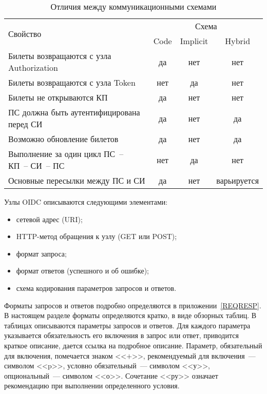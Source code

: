\begin{table}[H]
\caption{Отличия между коммуникационными схемами}\label{Table.OIDC.Flows}
\begin{tabular}{|l|c|c|c|}
\hline
\multirow{2}{*}{Свойство} & \multicolumn{3}{c|}{Схема}\\
\cline{2-4}
& Code & Implicit & Hybrid\\
\hline
\hline
Билеты возвращаются с узла Authorization & да & нет & нет\\
Билеты возвращаются с узла Token & нет & да & нет\\
Билеты не открываются КП & да & нет & нет\\
ПС должна быть аутентифицирована перед СИ & да & нет & да\\
Возможно обновление билетов & да & нет & да\\
Выполнение за один цикл ПС~-- КП~-- СИ~-- ПС & нет & да & нет\\
Основные пересылки между ПС и СИ & да & нет & варьируется\\
\hline
\end{tabular}
\end{table}

Узлы OIDC описываются следующими элементами:
\begin{itemize}
\item сетевой адрес (URI);
\item HTTP-метод обращения к узлу (GET или POST);
\item формат запроса;
\item формат ответов (успешного и об ошибке);
\item схема кодирования параметров запросов и ответов.
\end{itemize} 

Форматы запросов и ответов подробно определяются в приложении~\ref{REQRESP}.
В настоящем разделе форматы определяются  кратко, в виде обзорных таблиц.
% 
В таблицах описываются параметры запросов и ответов.
Для каждого параметра указывается обязательность его включения в запрос или 
ответ, приводится краткое описание, дается ссылка на подробное описание.
%
Параметр, обязательный для включения, помечается знаком <<$+$>>,
рекомендуемый для включения~--- символом <<p>>,
условно обязательный~--- символом <<у>>,
опциональный~--- символом <<о>>. Сочетание <<ру>> означает рекомендацию 
при выполнении определенного условия.

